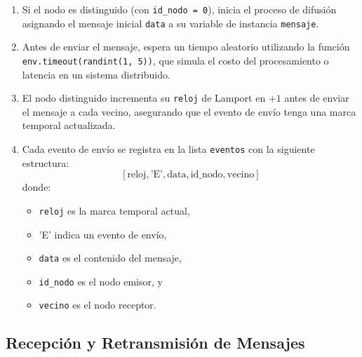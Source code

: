 \begin{enumerate}
	\item Si el nodo es distinguido (con \texttt{id\_nodo = 0}), inicia el proceso de difusión asignando el mensaje inicial \texttt{data} a su variable de instancia \texttt{mensaje}.
	
	\item Antes de enviar el mensaje, espera un tiempo aleatorio utilizando la función \texttt{env.timeout(randint(1, 5))}, que simula el costo del procesamiento o latencia en un sistema distribuido.
	
	\item El nodo distinguido incrementa su \texttt{reloj} de Lamport en $+1$ antes de enviar el mensaje a cada vecino, asegurando que el evento de envío tenga una marca temporal actualizada.
	
	\item Cada evento de envío se registra en la lista \texttt{eventos} con la siguiente estructura:
	\[
	[ \text{reloj}, \text{'E'}, \text{data}, \text{id\_nodo}, \text{vecino} ]
	\]
	donde:
	\begin{itemize}
		\item \texttt{reloj} es la marca temporal actual,
		\item 'E' indica un evento de envío,
		\item \texttt{data} es el contenido del mensaje,
		\item \texttt{id\_nodo} es el nodo emisor, y
		\item \texttt{vecino} es el nodo receptor.
	\end{itemize}
\end{enumerate}

\subsection{Recepción y Retransmisión de Mensajes}

